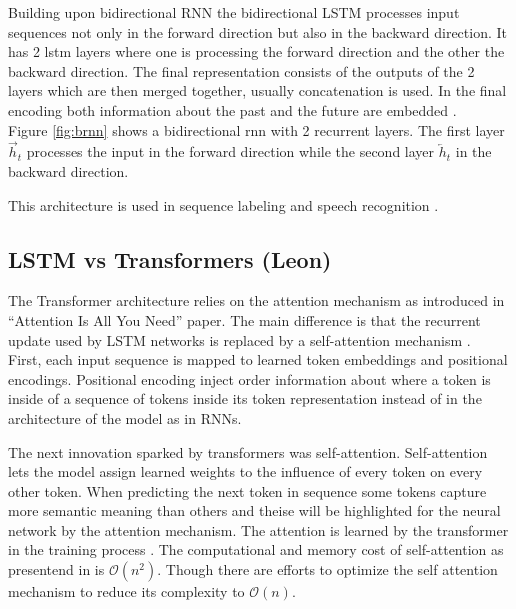\documentclass[twoside,a4paper,10pt,DIV=12,BCOR=12mm]{scrartcl}
\begin{document}
Building upon bidirectional RNN \cite{Schuster97} the bidirectional LSTM processes input sequences not only in the 
forward direction but also in the backward direction. It has 2 lstm layers where one is processing the forward direction
and the other the backward direction. The final representation consists of the outputs of the 2 layers which are then merged together,
usually concatenation is used. In the final encoding both information about the past and the future are embedded \cite{Graves05}.\\
Figure \ref{fig:brnn} shows a bidirectional rnn with 2 recurrent layers. The first layer $\overrightarrow{h}_t$ processes
the input in the forward direction while the second layer $\overleftarrow{h}_t$ in the backward direction.



This architecture is used in sequence labeling \cite{huang2015bidirectionallstmcrfmodelssequence} and speech recognition \cite{graves2013speechrecognitiondeeprecurrent}.

\subsection{LSTM vs Transformers (Leon)}

The Transformer architecture relies on the attention mechanism as introduced in “Attention Is All You Need” paper.
The main difference is that the recurrent update used by LSTM networks is replaced by a self-attention mechanism \cite{vaswani2017attention}.\\


First, each input sequence is mapped to learned token embeddings and positional encodings. Positional encoding 
inject order information about where a token is inside of a sequence of tokens inside its token representation instead of in the architecture of the model as in RNNs.


The next innovation sparked by transformers was self-attention. Self-attention lets the model assign learned weights to the influence of every token on every other token.
When predicting the next token in sequence some tokens capture more semantic meaning than others and theise will be highlighted for the neural network by the 
attention mechanism. The attention is learned by the transformer in the training process \cite{vaswani2017attention}.
The computational and memory cost of self-attention as presentend in \cite{vaswani2017attention} is $\mathcal{O}(n^2)$. Though there are efforts
to optimize the self attention mechanism to reduce its complexity to $\mathcal{O}(n)$. \cite{katharopoulos2020transformersrnnsfastautoregressive}
\end{document}
